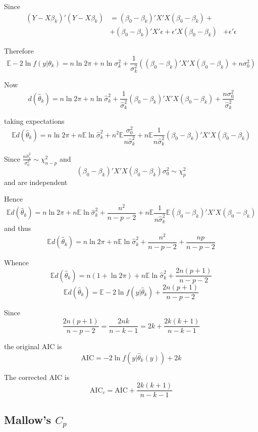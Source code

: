 \documentclass[a4paper]{article}
\newcommand{\brac}[1]{{\left ( #1 \right )}}
\newcommand{\induc}[1]{{\left . #1 \right \vert}}
\newcommand{\Ex}[0]{{\mathbb{E}}}
\begin{document}
Since 
\begin{align*}
	\brac{Y-X\beta_k}'\brac{Y-X\beta_k} &= \brac{\beta_0-\beta_k}'X'X\brac{\beta_0-\beta_k} + \\
		& + \brac{\beta_0 - \beta_k}'X'\epsilon + \epsilon'X\brac{\beta_0 - \beta_k}
		& + \epsilon'\epsilon
\end{align*}

Therefore 
\[\Ex-2\ln f\brac{\induc{y}\theta_k} = n \ln 2\pi + n\ln \sigma^2_k + \frac{1}{\sigma^2_k} \brac{ \brac{\beta_0-\beta_k}'X'X\brac{\beta_0-\beta_k} + n\sigma_0^2 }\]

Now 
\[d\brac{\hat{\theta}_k} = n \ln 2\pi + n\ln \hat{\sigma}^2_k + \frac{1}{\hat{\sigma}^2_k}\brac{\beta_0-\beta_k}'X'X\brac{\beta_0-\beta_k} + \frac{n\sigma_0^2}{\hat{\sigma}^2_k}\]

taking expectations
\[\Ex d\brac{\hat{\theta}_k} = n \ln 2\pi + n\Ex \ln \hat{\sigma}^2_k + n^2\Ex \frac{\sigma_0^2}{n\hat{\sigma}^2_k} + n \Ex \frac{1}{n\hat{\sigma}^2_k}\brac{\beta_0-\beta_k}'X'X\brac{\beta_0-\beta_k}\]

Since $\frac{n\hat{\sigma}^2_k}{\sigma_0^2} \sim \chi^2_{n-p}$ and 
\[\brac{\beta_0-\beta_k}'X'X\brac{\beta_0-\beta_k}{\sigma_0^2} \sim \chi^2_p\]
and are independent

Hence
\[\Ex d\brac{\hat{\theta}_k} = n \ln 2\pi + n\Ex \ln \hat{\sigma}^2_k + \frac{n^2}{n-p-2} + n \Ex \frac{1}{n\hat{\sigma}^2_k} \Ex \brac{\beta_0-\beta_k}'X'X\brac{\beta_0-\beta_k}\]
and thus 
\[\Ex d\brac{\hat{\theta}_k} = n \ln 2\pi + n\Ex \ln \hat{\sigma}^2_k + \frac{n^2}{n-p-2} + \frac{n p}{n-p-2} \]

Whence 
\[\Ex d\brac{\hat{\theta}_k} = n \brac{1+\ln 2\pi} + n\Ex \ln \hat{\sigma}^2_k + \frac{2n(p+1)}{n-p-2}\]
\[\Ex d\brac{\hat{\theta}_k} = \Ex -2 \ln f\brac{\induc{y}\hat{\theta}_k} + \frac{2n(p+1)}{n-p-2}\]

Since 
\[\frac{2n(p+1)}{n-p-2} = \frac{2nk}{n-k-1} = 2k + \frac{2k(k+1)}{n-k-1}\]

the original AIC is
\[\text{AIC} = -2 \ln f\brac{\induc{y}\hat{\theta}_k(y)} + 2k\]

The corrected AIC is 
\[\text{AIC}_c = \text{AIC} + \frac{2k(k+1)}{n-k-1}\]


\subsection{Mallow's $C_p$} %
\label{sub:mallows_cp}
\end{document}
